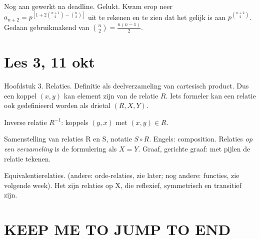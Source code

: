 \documentclass{article}
\begin{document}
Nog aan gewerkt na deadline. 
Gelukt. 
Kwam erop neer $a_{n+2}=p^{[1+2\binom{n+1}{2}-\binom{n}{2}]}$ uit te rekenen en te zien dat het gelijk is aan $p^{\binom{n+2}{2}}$. Gedaan gebruikmakend van $\binom{n}{2} = \frac{n(n-1)}{2}$. 

\section{Les 3, 11 okt}

Hoofdstuk 3. Relaties. Definitie als deelverzameling van cartesisch product. Dus een koppel $(x,y)$ kan element zijn van de relatie $R$. Iets formeler kan een relatie ook gedefinieerd worden als drietal $(R,X,Y)$. 

Inverse relatie $R^{-1}$: koppels $(y,x)$ met $(x,y) \in R$. 

Samenstelling van relaties R en S, notatie $S \circ R$. Engels: composition. Relaties \emph{op een verzameling} is de formulering als $X=Y$. Graaf, gerichte graaf: met pijlen de relatie tekenen. 

Equivalentierelaties. (andere: orde-relaties, zie later; nog andere: functies, zie volgende week). Het zijn relaties op X, die reflexief, symmetrisch en transitief zijn. 

\section{KEEP ME TO JUMP TO END}
\end{document}
